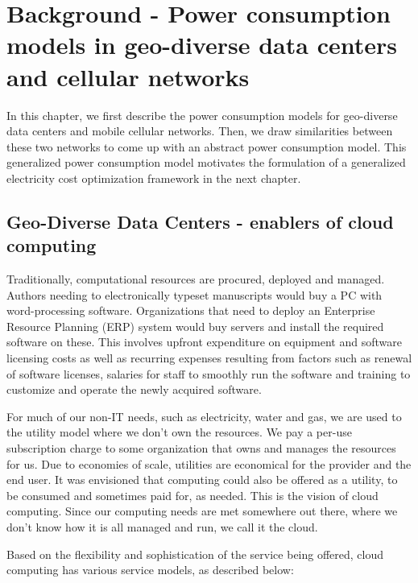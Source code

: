\chapter{Background - Power consumption models in geo-diverse data centers and cellular networks}
\label{chap:background}
In this chapter, we first describe the power consumption models for geo-diverse data centers and mobile cellular networks. Then, we draw similarities between these two networks to come up with an abstract power consumption model. This generalized power consumption model motivates the formulation of a generalized electricity cost optimization framework in the next chapter. 

\section{Geo-Diverse Data Centers - enablers of cloud computing} Traditionally, computational resources are procured, deployed and managed. Authors needing to electronically typeset manuscripts would buy a PC with word-processing software. Organizations that need to deploy an Enterprise Resource Planning (ERP) system would buy servers and install the required software on these. This involves upfront expenditure on equipment and software licensing costs as well as recurring expenses resulting from factors such as renewal of software licenses, salaries for staff to smoothly run the software and training to customize and operate the newly acquired software. 

For much of our non-IT needs, such as electricity, water and gas, we are used to the utility model where we don't own the resources. We pay a per-use subscription charge to some organization that owns and manages the resources for us. Due to economies of scale, utilities are economical for the provider and the end user. It was envisioned that computing could also be offered as a utility, to be consumed and sometimes paid for, as needed. This is the vision of cloud computing. Since our computing needs are met somewhere out there, where we don't know how it is all managed and run, we call it the cloud.

Based on the flexibility and sophistication of the service being offered, cloud computing has various service models, as described below: 

